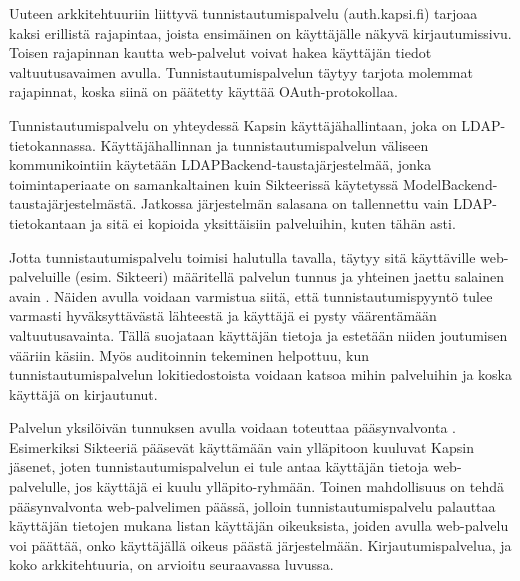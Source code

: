 Uuteen arkkitehtuuriin liittyvä tunnistautumispalvelu (auth.kapsi.fi) tarjoaa kaksi erillistä rajapintaa, joista ensimäinen on käyttäjälle näkyvä kirjautumissivu. Toisen rajapinnan kautta web-palvelut voivat hakea käyttäjän tiedot valtuutusavaimen avulla. Tunnistautumispalvelun täytyy tarjota molemmat rajapinnat, koska siinä on päätetty käyttää OAuth-protokollaa.

Tunnistautumispalvelu on yhteydessä Kapsin käyttäjähallintaan, joka on LDAP-tietokannassa. Käyttäjähallinnan ja tunnistautumispalvelun väliseen kommunikointiin käytetään LDAPBack\-end-taustajärjestelmää, jonka toimintaperiaate on samankaltainen kuin Sikteerissä käytetyssä ModelBackend-taustajärjestelmästä. Jatkossa järjestelmän salasana on tallennettu vain LDAP-tietokantaan ja sitä ei kopioida yksittäisiin palveluihin, kuten tähän asti.

Jotta tunnistautumispalvelu toimisi halutulla tavalla, täytyy sitä käyttäville web-palveluille (esim. Sikteeri) määritellä palvelun tunnus ja yhteinen jaettu salainen avain \cite{oauth2_0}. Näiden avulla voidaan varmistua siitä, että tunnistautumispyyntö tulee varmasti hyväksyttävästä lähteestä ja käyttäjä ei pysty väärentämään valtuutusavainta. Tällä suojataan käyttäjän tietoja ja estetään niiden joutumisen vääriin käsiin. Myös auditoinnin tekeminen helpottuu, kun tunnistautumispalvelun lokitiedostoista voidaan katsoa mihin palveluihin ja koska käyttäjä on kirjautunut.

Palvelun yksilöivän tunnuksen avulla voidaan toteuttaa pääsynvalvonta \cite{oauth2_0}. Esimerkiksi Sikteeriä pääsevät käyttämään vain ylläpitoon kuuluvat Kapsin jäsenet, joten tunnistautumispalvelun ei tule antaa käyttäjän tietoja web-palvelulle, jos käyttäjä ei kuulu ylläpito-ryhmään. Toinen mahdollisuus on tehdä pääsynvalvonta web-palvelimen päässä, jolloin tunnistautumispalvelu palauttaa käyttäjän tietojen mukana listan käyttäjän oikeuksista, joiden avulla web-palvelu voi päättää, onko käyttäjällä oikeus päästä järjestelmään. Kirjautumispalvelua, ja koko arkkitehtuuria, on arvioitu seuraavassa luvussa.